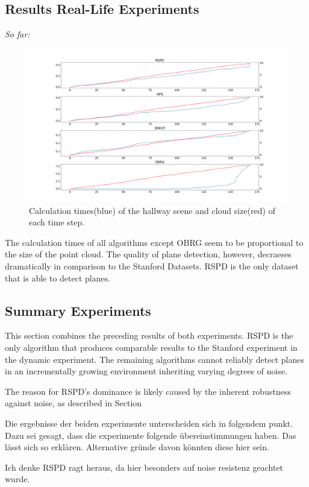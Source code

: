 \documentclass[main.tex]{subfiles}
\begin{document}
\subsection{Results Real-Life Experiments}
\textit{So far:}

\begin{figure}[]
    \centering
    \includegraphics[width=\textwidth]{images/dyn_time-hallway.png}
    \caption[Time Results Hallway]{Calculation times(blue) of the hallway scene and cloud size(red) of each time step.}
    \label{fig:dynhallway}
\end{figure}

The calculation times of all algorithms except OBRG seem to be proportional to the size of the point cloud.
The quality of plane detection, however, decraeses dramatically in comparison to the Stanford Datasets. RSPD is the only dataset that 
is able to detect planes. %


\subsection*{Summary Experiments}
This section combines the preceding results of both experiments.
RSPD is the only algorithm that produces comparable results to the Stanford experiment in the dynamic experiment.
The remaining algorithms cannot reliably detect planes in an incrementally growing environment inheriting varying degrees of noise.

The reason for RSPD's dominance is likely caused by the inherent robustness against noise, as described in Section~ 

Die ergebnisse der beiden experimente unterscheiden sich in folgendem punkt. Dazu sei gesagt, dass die experimente folgende übereinstimmungen haben.
Das lässt sich so erklären. Alternative gründe davon könnten diese hier sein.

Ich denke RSPD ragt heraus, da hier besonders auf noise resistenz geachtet wurde. %
\end{document}
